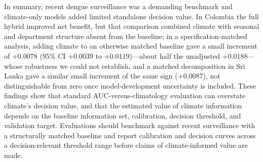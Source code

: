 \documentclass[11pt,a4paper]{article}
\begin{document}
In summary, recent dengue surveillance was a demanding benchmark and climate-only models added limited standalone decision value. In Colombia the full hybrid improved net benefit, but that comparison combined climate with seasonal and department structure absent from the baseline; in a specification-matched analysis, adding climate to an otherwise matched baseline gave a small increment of $+0.0078$ (95\% CI $+0.0039$ to $+0.0119$)---about half the unadjusted $+0.0188$---whose robustness we could not establish, and a matched decomposition in Sri Lanka gave a similar small increment of the same sign ($+0.0087$), not distinguishable from zero once model-development uncertainty is included. These findings show that standard AUC-versus-climatology evaluation can overstate climate's decision value, and that the estimated value of climate information depends on the baseline information set, calibration, decision threshold, and validation target. Evaluations should benchmark against recent surveillance with a structurally matched baseline and report calibration and decision curves across a decision-relevant threshold range before claims of climate-informed value are made.

\end{document}
